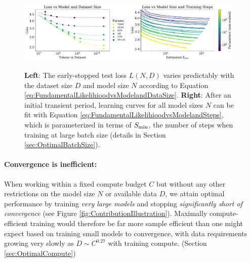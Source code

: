 \documentclass[english]{article}
\begin{document}
\begin{figure}
\noindent \centering{} 
\includegraphics[width=0.48\textwidth]{LossvsModelDatasetSize}
\includegraphics[width=0.48\textwidth]{LearningCurveFitComparisonIntro}
\caption[Performance when varying model and data size, or model and training steps, simultaneously]{
{\bf Left}: The early-stopped test loss $L(N, D)$ varies predictably with the dataset size $D$ and model size $N$ according to Equation \eqref{eq:FundamentalLikelihioodvsModelandDataSize}.  
{\bf Right}:  After an initial transient period, learning curves for all model sizes $N$ can be fit with Equation \eqref{eq:FundamentalLikelihioodvsModelandSteps}, which is parameterized in terms of $S_{\rm min}$, the number of steps when training at large batch size (details in Section \ref{sec:OptimalBatchSize}).  \label{fig:LearningCurveFitsandResiduals}
\label{fig:LossvsModelDatasetSize}}
\end{figure}

\paragraph{Convergence is inefficient:} When working within a fixed compute budget $C$ but without any other restrictions on the model size $N$ or available data $D$, we attain optimal performance by training \emph{very large models} and stopping \emph{significantly short of convergence} (see Figure \ref{fig:ContributionIllustration}).  Maximally compute-efficient training would therefore be far more sample efficient than one might expect based on training small models to convergence, with data requirements growing very slowly as $D \sim C^{0.27}$ with training compute. (Section \ref{sec:OptimalCompute})
\end{document}
